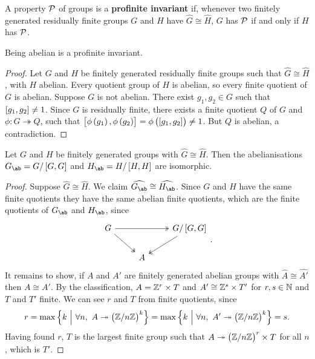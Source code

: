 
\begin{definition}
A property $ \mathcal{P} $ of groups is a \textbf{profinite invariant} if, whenever two finitely generated residually finite groups $ G $ and $ H $ have $ \widehat{G} \cong \widehat{H} $, $ G $ has $ \mathcal{P} $ if and only if $ H $ has $ \mathcal{P} $.
\end{definition}

\begin{proposition}
Being abelian is a profinite invariant.
\end{proposition}

\begin{proof}
Let $ G $ and $ H $ be finitely generated residually finite groups such that $ \widehat{G} \cong \widehat{H} $, with $ H $ abelian. Every quotient group of $ H $ is abelian, so every finite quotient of $ G $ is abelian. Suppose $ G $ is not abelian. There exist $ g_1, g_2 \in G $ such that $ \sbr{g_1, g_2} \ne 1 $. Since $ G $ is residually finite, there exists a finite quotient $ Q $ of $ G $ and $ \phi : G \twoheadrightarrow Q $, such that $ \sbr{\phi\br{g_1}, \phi\br{g_2}} = \phi\br{\sbr{g_1, g_2}} \ne 1 $. But $ Q $ is abelian, a contradiction.
\end{proof}

\pagebreak

\begin{proposition}
Let $ G $ and $ H $ be finitely generated groups with $ \widehat{G} \cong \widehat{H} $. Then the abelianisations $ G_{\ab} = G / \sbr{G, G} $ and $ H_{\ab} = H / \sbr{H, H} $ are isomorphic.
\end{proposition}

\begin{proof}
Suppose $ \widehat{G} \cong \widehat{H} $. We claim $ \widehat{G_{\ab}} \cong \widehat{H_{\ab}} $. Since $ G $ and $ H $ have the same finite quotients they have the same abelian finite quotients, which are the finite quotients of $ G_{\ab} $ and $ H_{\ab} $, since
$$
\begin{tikzcd}
G \arrow[twoheadrightarrow]{rr} \arrow[twoheadrightarrow]{dr} & & G / \sbr{G, G} \arrow[twoheadrightarrow]{dl} \\
& A &
\end{tikzcd}.
$$
It remains to show, if $ A $ and $ A' $ are finitely generated abelian groups with $ \widehat{A} \cong \widehat{A'} $ then $ A \cong A' $. By the classification, $ A = \mathbb{Z}^r \times T $ and $ A' \cong \mathbb{Z}^s \times T' $ for $ r, s \in \mathbb{N} $ and $ T $ and $ T' $ finite. We can see $ r $ and $ T $ from finite quotients, since
$$ r = \max \cbr{k \st \forall n, \ A \twoheadrightarrow \br{\ZZ / n\ZZ}^k} = \max \cbr{k \st \forall n, \ A' \twoheadrightarrow \br{\ZZ / n\ZZ}^k} = s. $$
Having found $ r $, $ T $ is the largest finite group such that $ A \twoheadrightarrow \br{\ZZ / n\ZZ}^r \times T $ for all $ n $, which is $ T' $.
\end{proof}


